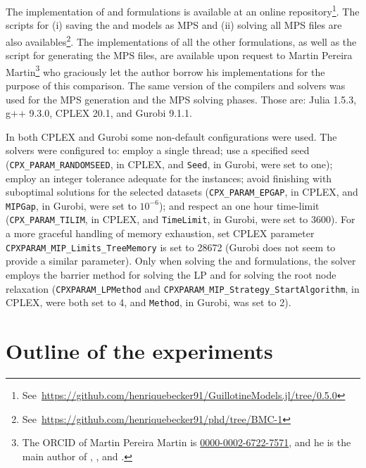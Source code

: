 The implementation of {\modelBecker} and {\modelFMT} formulations is available at an online repository\footnote{See~\url{https://github.com/henriquebecker91/GuillotineModels.jl/tree/0.5.0}}.
The scripts for (i) saving the {\modelBecker} and {\modelFMT} models as MPS and (ii) solving all MPS files are also availables\footnote{See~\url{https://github.com/henriquebecker91/phd/tree/BMC-1}}.
The implementations of all the other formulations, as well as the script for generating the MPS files, are available upon request to Martin Pereira Martin\footnote{The ORCID of Martin Pereira Martin is \href{https://orcid.org/0000-0002-6722-7571}{0000-0002-6722-7571}, and he is the main author of \citet{martin:2020}, \citet{martin:2020:bottom}, and \citet{martin:2020:top}.} who graciously let the author borrow his implementations for the purpose of this comparison. %
The same version of the compilers and solvers was used for the MPS generation and the MPS solving phases.
Those are: Julia 1.5.3, g++ 9.3.0, CPLEX 20.1, and Gurobi 9.1.1.

In both CPLEX and Gurobi some non-default configurations were used.
The solvers were configured to:
employ a single thread;
use a specified seed (\texttt{CPX_PARAM_RANDOMSEED}, in CPLEX, and \texttt{Seed}, in Gurobi, were set to one);
employ an integer tolerance adequate for the instances; avoid finishing with suboptimal solutions for the selected datasets (\texttt{CPX_PARAM_EPGAP}, in CPLEX, and \texttt{MIPGap}, in Gurobi, were set to \(10^{-6}\));
and respect an one hour time-limit (\texttt{CPX_PARAM_TILIM}, in CPLEX, and \texttt{TimeLimit}, in Gurobi, were set to 3600). For a more graceful handling of memory exhaustion, set CPLEX parameter \texttt{CPXPARAM_MIP_Limits_TreeMemory} is set to 28672 (Gurobi does not seem to provide a similar parameter).
Only when solving the {\modelFMT} and {\modelBecker} formulations, the solver employs the barrier method for solving the LP and for solving the root node relaxation (\texttt{CPXPARAM_LPMethod} and \texttt{CPXPARAM_MIP_Strategy_StartAlgorithm}, in CPLEX, were both set to 4, and \texttt{Method}, in Gurobi, was set to 2).

\section{Outline of the experiments}
\label{sec:outine_experiments_other_formulations}

